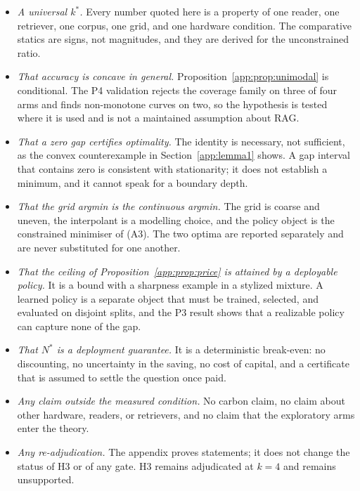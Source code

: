 \begin{itemize}
  \item \emph{A universal $k^{*}$.} Every number quoted here is a property of one
  reader, one retriever, one corpus, one grid, and one hardware condition. The
  comparative statics are signs, not magnitudes, and they are derived for the
  unconstrained ratio.
  \item \emph{That accuracy is concave in general.} Proposition~\ref{app:prop:unimodal}
  is conditional. The P4 validation rejects the coverage family on three of four
  arms and finds non-monotone curves on two, so the hypothesis is tested where it
  is used and is not a maintained assumption about RAG.
  \item \emph{That a zero gap certifies optimality.} The identity is necessary,
  not sufficient, as the convex counterexample in Section~\ref{app:lemma1} shows.
  A gap interval that contains zero is consistent with stationarity; it does not
  establish a minimum, and it cannot speak for a boundary depth.
  \item \emph{That the grid argmin is the continuous argmin.} The grid is coarse
  and uneven, the interpolant is a modelling choice, and the policy object is the
  constrained minimiser of (A3). The two optima are reported separately and are
  never substituted for one another.
  \item \emph{That the ceiling of Proposition~\ref{app:prop:price} is attained by
  a deployable policy.} It is a bound with a sharpness example in a stylized
  mixture. A learned policy is a separate object that must be trained, selected,
  and evaluated on disjoint splits, and the P3 result shows that a realizable
  policy can capture none of the gap.
  \item \emph{That $N^{*}$ is a deployment guarantee.} It is a deterministic
  break-even: no discounting, no uncertainty in the saving, no cost of capital,
  and a certificate that is assumed to settle the question once paid.
  \item \emph{Any claim outside the measured condition.} No carbon claim, no
  claim about other hardware, readers, or retrievers, and no claim that the
  exploratory arms enter the theory.
  \item \emph{Any re-adjudication.} The appendix proves statements; it does not
  change the status of H3 or of any gate. H3 remains adjudicated at $k=4$ and
  remains unsupported.
\end{itemize}
